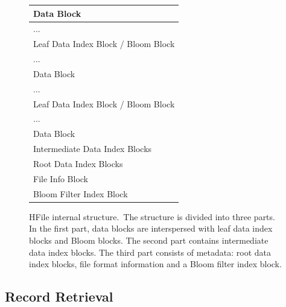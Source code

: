 \begin{figure}
  \begin{center}
    \begin{tabular}{|l|}
      \hline
      \rowcolor[gray]{0.85}
      Data Block \\
      \hline
      \rowcolor[gray]{0.85}
      ... \\
      \hline
      \rowcolor[gray]{0.95}
      Leaf Data Index Block / Bloom Block \\
      \hline
      \rowcolor[gray]{0.85}
      ... \\
      \hline
      \rowcolor[gray]{0.85}
      Data Block \\
      \hline
      \rowcolor[gray]{0.85}
      ... \\
      \hline
      \rowcolor[gray]{0.95}
      Leaf Data Index Block / Bloom Block \\
      \hline
      \rowcolor[gray]{0.85}
      ... \\
      \hline
      \rowcolor[gray]{0.85}
      Data Block \\
      \hline
      \hline
      \rowcolor[gray]{0.9}
      Intermediate Data Index Blocks \\
      \hline
      \hline
      \rowcolor[gray]{0.7}
      Root Data Index Blocks \\
      \hline
      \rowcolor[gray]{0.7}
      File Info Block \\
      \hline
      \rowcolor[gray]{0.7}
      Bloom Filter Index Block \\
      \hline
    \end{tabular}
    \caption[Caption for LOF]{HFile internal structure.\footnotemark \ The
      structure is divided into three parts. In the first part, data blocks
      are interspersed with leaf data index blocks and Bloom blocks. The second
      part contains intermediate data index blocks. The third part consists
      of metadata: root data index blocks, file format information and a Bloom
      filter index block.}
    \label{fig:hfile}
  \end{center}
\end{figure}


\subsection{Record Retrieval}
\label{sec:recordRetrieval}

